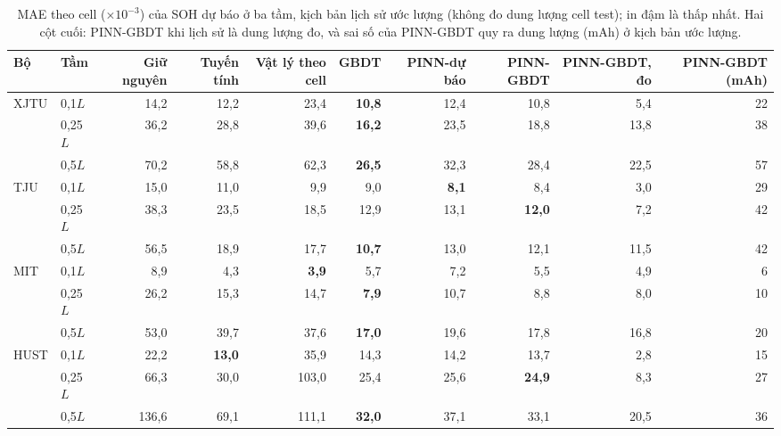 \begin{table}[!hbp]\centering\small
\caption[MAE của SOH dự báo ở ba tầm]{MAE theo cell ($\times10^{-3}$) của SOH dự báo ở ba tầm, kịch bản lịch sử ước lượng (không đo dung lượng cell test); in đậm là thấp nhất. Hai cột cuối: PINN-GBDT khi lịch sử là dung lượng đo, và sai số của PINN-GBDT quy ra dung lượng (mAh) ở kịch bản ước lượng.}\label{tab:e22soh}
\begin{adjustbox}{max width=\textwidth}\begin{tabular}{llrrrrrrrr}\toprule
Bộ & Tầm & Giữ nguyên & Tuyến tính & Vật lý theo cell & GBDT & PINN-dự báo & PINN-GBDT & PINN-GBDT, đo & PINN-GBDT (mAh) \\\midrule
XJTU & 0{,}1$L$ & 14{,}2 & 12{,}2 & 23{,}4 & \textbf{10{,}8} & 12{,}4 & 10{,}8 & 5{,}4 & 22 \\
 & 0{,}25$L$ & 36{,}2 & 28{,}8 & 39{,}6 & \textbf{16{,}2} & 23{,}5 & 18{,}8 & 13{,}8 & 38 \\
 & 0{,}5$L$ & 70{,}2 & 58{,}8 & 62{,}3 & \textbf{26{,}5} & 32{,}3 & 28{,}4 & 22{,}5 & 57 \\
TJU & 0{,}1$L$ & 15{,}0 & 11{,}0 & 9{,}9 & 9{,}0 & \textbf{8{,}1} & 8{,}4 & 3{,}0 & 29 \\
 & 0{,}25$L$ & 38{,}3 & 23{,}5 & 18{,}5 & 12{,}9 & 13{,}1 & \textbf{12{,}0} & 7{,}2 & 42 \\
 & 0{,}5$L$ & 56{,}5 & 18{,}9 & 17{,}7 & \textbf{10{,}7} & 13{,}0 & 12{,}1 & 11{,}5 & 42 \\
MIT & 0{,}1$L$ & 8{,}9 & 4{,}3 & \textbf{3{,}9} & 5{,}7 & 7{,}2 & 5{,}5 & 4{,}9 & 6 \\
 & 0{,}25$L$ & 26{,}2 & 15{,}3 & 14{,}7 & \textbf{7{,}9} & 10{,}7 & 8{,}8 & 8{,}0 & 10 \\
 & 0{,}5$L$ & 53{,}0 & 39{,}7 & 37{,}6 & \textbf{17{,}0} & 19{,}6 & 17{,}8 & 16{,}8 & 20 \\
HUST & 0{,}1$L$ & 22{,}2 & \textbf{13{,}0} & 35{,}9 & 14{,}3 & 14{,}2 & 13{,}7 & 2{,}8 & 15 \\
 & 0{,}25$L$ & 66{,}3 & 30{,}0 & 103{,}0 & 25{,}4 & 25{,}6 & \textbf{24{,}9} & 8{,}3 & 27 \\
 & 0{,}5$L$ & 136{,}6 & 69{,}1 & 111{,}1 & \textbf{32{,}0} & 37{,}1 & 33{,}1 & 20{,}5 & 36 \\
\bottomrule\end{tabular}\end{adjustbox}\end{table}

